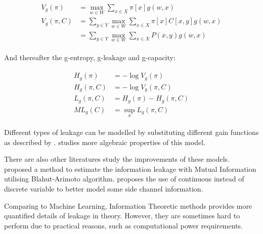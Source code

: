 \begin{eqnarray}
	\begin{aligned}
		V_{g}(\pi) &= \max_{w \in W}\sum_{x \in X}{\pi[x]g(w,x)} \\
		V_{g}(\pi, C) &= \sum_{y \in Y}{\max_{w \in W}\sum_{x \in X}{\pi[x]C[x,y]g(w,x)}} \\
		&= \sum_{y \in Y}\max_{w \in W}\sum_{x \in X}P(x,y)g(w,x)
	\end{aligned}
\end{eqnarray}

And thereafter the g-entropy, g-leakage and g-capacity:

\begin{eqnarray}
	\begin{aligned}
		H_{g}(\pi) &= -\log{V_g(\pi)} \\
		H_{g}(\pi, C) &= -\log{V_g(\pi,C)}\\
		L_g(\pi, C) &= H_{g}(\pi) - H_{g}(\pi, C)\\
		ML_g(C) &= \sup_{\pi}{L_g(\pi,C)}
	\end{aligned}
\end{eqnarray}

Different types of leakage can be modelled by substituting different gain functions as described by \cite{GLeakage}. \cite{AddMulGLeakage} studies more algebraic properties of this model.

There are also other literatures study the improvements of these models. \cite{EstimateLeakage} proposed a method to estimate the information leakage with Mutual Information utilising Blahut-Arimoto algorithm\cite{Blahut}\cite{Arimoto}. \cite{Continuous} proposes the use of continuous instead of discrete variable to  better model some side channel information.

Comparing to Machine Learning, Information Theoretic methods provides more quantified details of leakage in theory. However, they are sometimes hard to perform due to practical reasons, such as computational power requirements.



